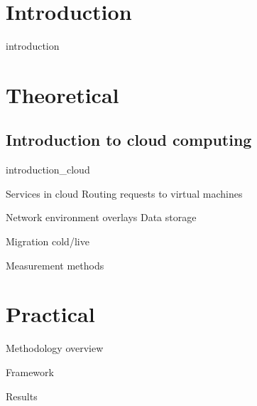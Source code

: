 \documentclass[12pt,oneside,a4paper]{report} %
\begin{document}
\tableofcontents
\cleardoublepage

\pagestyle{plain}

\chapter{Introduction}
{introduction}

\chapter{Theoretical}
	\section{Introduction to cloud computing}
	{introduction_cloud}
\pagebreak


	Services in cloud
	Routing requests to virtual machines

	Network environment
		overlays
	Data storage

	Migration
		cold/live
			
	Measurement methods
	



\chapter{Practical}
	Methodology overview

	Framework

	Results



\newpage
{} \label{listoffig}
\listoffigures

\newpage
{} \label{listoftab}
\listoftables


\printglossary[type=acronym,title=List of acronyms,toctitle=List of acronyms]

\end{document}
